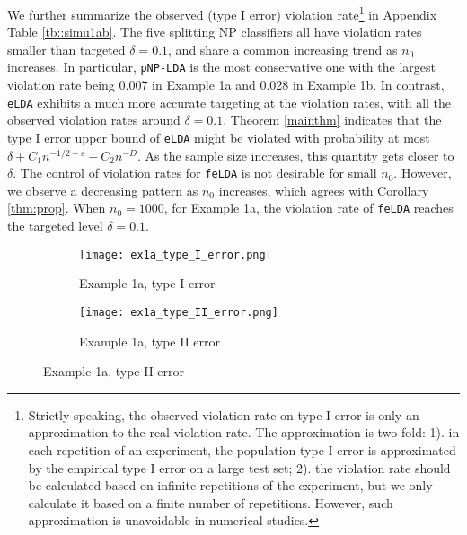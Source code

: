 \documentclass[12pt]{article}
\numberwithin{equation}{section}
\theoremstyle{remark}
\newcommand{\1}{{\rm 1}\kern-0.24em{\rm I}}
\begin{document}
We further summarize the observed (type I error) violation rate\footnote{Strictly speaking, the observed violation rate on type I error is only an approximation to the real violation rate.  The approximation is two-fold: 1). in each repetition of an experiment, the population type I error is approximated by the empirical type I error on a large test set; 2). the violation rate should be calculated based on infinite repetitions of the experiment, but we only calculate it based on a finite number of repetitions. However, such approximation is unavoidable in numerical studies.} in Appendix Table \ref{tb::simu1ab}.  The five splitting NP classifiers all have violation rates smaller than targeted $\delta=0.1$,  and share a common increasing trend as $n_0$ increases.  In particular,  \verb+pNP-LDA+ is the most conservative one with the largest violation rate being 0.007 in Example 1a and 0.028 in Example 1b.  In contrast,  \verb+eLDA+ exhibits a much more accurate targeting at the violation rates, with all the observed violation rates around  $\delta=0.1$.  Theorem \ref{mainthm}  indicates that the type I error upper bound of \verb+eLDA+ might be violated with probability at most $\delta+C_1 n^{-1/2+\varepsilon}+ C_2 n^{-D}$.  As the sample size increases, this quantity gets closer to $\delta$.  The control of violation rates for \verb+feLDA+ is not desirable for small $n_0$. However, we observe a decreasing pattern as $n_0$ increases,  which agrees with Corollary \ref{thm:prop}.  When $n_0=1000$, for Example 1a, the violation rate of \verb+feLDA+ reaches the targeted level $\delta=0.1$. 

\begin{figure}[h]
\caption{Examples 1a,  type I and type II errors for competing methods with increasing balanced sample sizes.  \label{fig::ex 1a}}

 \begin{subfigure}[t]{0.5\textwidth}
        \centering
        \texttt{[image: ex1a\_type\_I\_error.png]}
        \caption{Example 1a, type I error}
    \end{subfigure}%
    \hspace{+0.1cm}
        \begin{subfigure}[t]{0.5\textwidth}
        \centering
        \texttt{[image: ex1a\_type\_II\_error.png]}
        \caption{Example 1a, type II error}
    \end{subfigure}%
%    

\end{figure}
\end{document}
